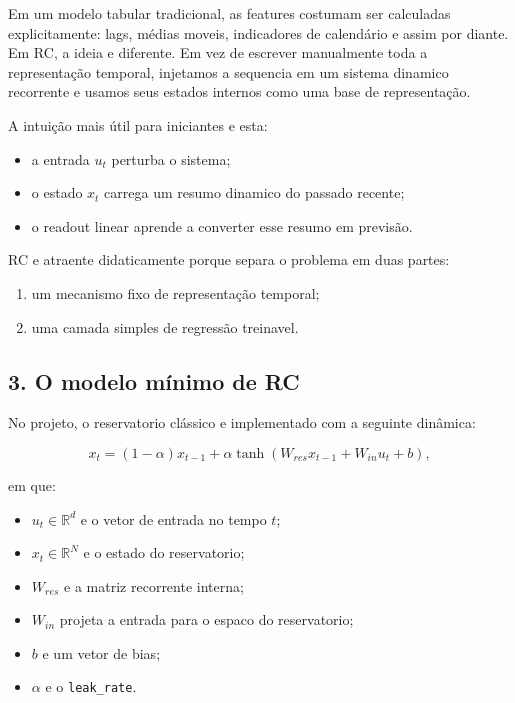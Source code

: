 \documentclass[12pt]{article}
\providecommand{\tightlist}{%
          \setlength{\itemsep}{0pt}\setlength{\parskip}{0pt}}
\begin{document}
Em um modelo tabular tradicional, as features costumam ser calculadas explicitamente: lags, médias moveis, indicadores de calendário e assim por diante. Em RC, a ideia e diferente. Em vez de escrever manualmente toda a representação temporal, injetamos a sequencia em um sistema dinamico recorrente e usamos seus estados internos como uma base de representação.

A intuição mais útil para iniciantes e esta:

\begin{itemize}
\tightlist
\item
  a entrada \(u_t\) perturba o sistema;
\item
  o estado \(x_t\) carrega um resumo dinamico do passado recente;
\item
  o readout linear aprende a converter esse resumo em previsão.
\end{itemize}

RC e atraente didaticamente porque separa o problema em duas partes:

\begin{enumerate}
\def\labelenumi{\arabic{enumi}.}
\tightlist
\item
  um mecanismo fixo de representação temporal;
\item
  uma camada simples de regressão treinavel.
\end{enumerate}

\subsection{3. O modelo mínimo de RC}\label{3-o-modelo-muxednimo-de-rc}

No projeto, o reservatorio clássico e implementado com a seguinte dinâmica:

\[
x_t = (1 - \alpha) x_{t-1} + \alpha \tanh(W_{res} x_{t-1} + W_{in} u_t + b),
\]

em que:

\begin{itemize}
\tightlist
\item
  \(u_t \in \mathbb{R}^d\) e o vetor de entrada no tempo \(t\);
\item
  \(x_t \in \mathbb{R}^N\) e o estado do reservatorio;
\item
  \(W_{res}\) e a matriz recorrente interna;
\item
  \(W_{in}\) projeta a entrada para o espaco do reservatorio;
\item
  \(b\) e um vetor de bias;
\item
  \(\alpha\) e o \texttt{leak\_rate}.
\end{itemize}
\end{document}

